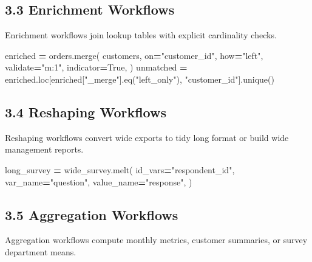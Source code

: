 \documentclass[
  12pt,
]{article}
\newenvironment{Shaded}{\begin{snugshade}}{\end{snugshade}}
\newcommand{\NormalTok}[1]{#1}
\newcommand{\OperatorTok}[1]{\textcolor[rgb]{0.81,0.36,0.00}{\textbf{#1}}}
\newcommand{\StringTok}[1]{\textcolor[rgb]{0.31,0.60,0.02}{#1}}
\newcommand{\VariableTok}[1]{\textcolor[rgb]{0.00,0.00,0.00}{#1}}
\begin{document}
\subsection{3.3 Enrichment Workflows}\label{enrichment-workflows}

Enrichment workflows join lookup tables with explicit cardinality
checks.

\begin{Shaded}
\begin{Highlighting}[]
\NormalTok{enriched }\OperatorTok{=}\NormalTok{ orders.merge(}
\NormalTok{    customers,}
\NormalTok{    on}\OperatorTok{=}\StringTok{"customer\_id"}\NormalTok{,}
\NormalTok{    how}\OperatorTok{=}\StringTok{"left"}\NormalTok{,}
\NormalTok{    validate}\OperatorTok{=}\StringTok{"m:1"}\NormalTok{,}
\NormalTok{    indicator}\OperatorTok{=}\VariableTok{True}\NormalTok{,}
\NormalTok{)}
\NormalTok{unmatched }\OperatorTok{=}\NormalTok{ enriched.loc[enriched[}\StringTok{"\_merge"}\NormalTok{].eq(}\StringTok{"left\_only"}\NormalTok{), }\StringTok{"customer\_id"}\NormalTok{].unique()}
\end{Highlighting}
\end{Shaded}

\subsection{3.4 Reshaping Workflows}\label{reshaping-workflows}

Reshaping workflows convert wide exports to tidy long format or build
wide management reports.

\begin{Shaded}
\begin{Highlighting}[]
\NormalTok{long\_survey }\OperatorTok{=}\NormalTok{ wide\_survey.melt(}
\NormalTok{    id\_vars}\OperatorTok{=}\StringTok{"respondent\_id"}\NormalTok{,}
\NormalTok{    var\_name}\OperatorTok{=}\StringTok{"question"}\NormalTok{,}
\NormalTok{    value\_name}\OperatorTok{=}\StringTok{"response"}\NormalTok{,}
\NormalTok{)}
\end{Highlighting}
\end{Shaded}

\subsection{3.5 Aggregation Workflows}\label{aggregation-workflows}

Aggregation workflows compute monthly metrics, customer summaries, or
survey department means.
\end{document}
